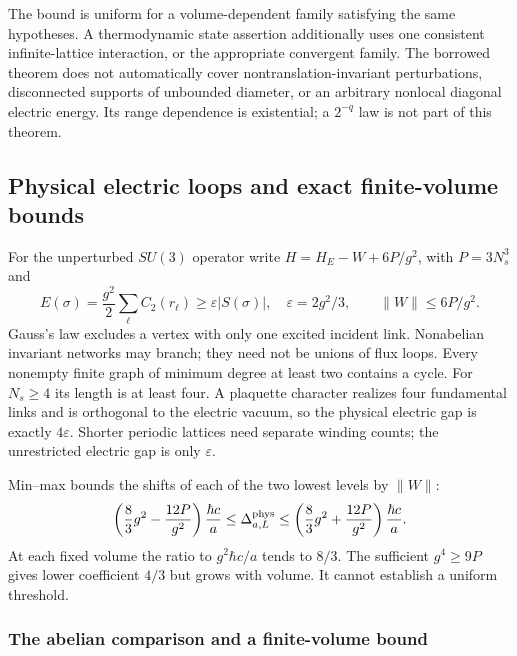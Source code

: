 \documentclass[11pt,a4paper]{article}
\begin{document}
The bound is uniform for a volume-dependent family satisfying the same
hypotheses. A thermodynamic state assertion additionally uses one
consistent infinite-lattice interaction, or the appropriate convergent
family. The borrowed theorem does not automatically cover
nontranslation-invariant perturbations, disconnected supports of
unbounded diameter, or an arbitrary nonlocal diagonal electric energy.
Its range dependence is existential; a \(2^{-q}\) law is not part of
this theorem.

\hypertarget{physical-electric-loops-and-exact-finite-volume-bounds}{%
\subsection{Physical electric loops and exact finite-volume
bounds}\label{physical-electric-loops-and-exact-finite-volume-bounds}}

For the unperturbed \(SU(3)\) operator write \(H=H_E-W+6P/g^2\), with
\(P=3N_s^3\) and \[E(\sigma)=\frac{g^2}{2}\sum_\ell C_2(r_\ell)
 \ge\varepsilon|S(\sigma)|,\quad \varepsilon=2g^2/3,
 \qquad \|W\|\le6P/g^2.\] Gauss's law excludes a vertex with only one
excited incident link. Nonabelian invariant networks may branch; they
need not be unions of flux loops. Every nonempty finite graph of minimum
degree at least two contains a cycle. For \(N_s\ge4\) its length is at
least four. A plaquette character realizes four fundamental links and is
orthogonal to the electric vacuum, so the physical electric gap is
exactly \(4\varepsilon\). Shorter periodic lattices need separate
winding counts; the unrestricted electric gap is only \(\varepsilon\).

Min--max bounds the shifts of each of the two lowest levels by
\(\|W\|\): \[\left(\frac83g^2-\frac{12P}{g^2}\right)\frac{\hbar c}{a}
 \le\Delta^{\rm phys}_{a,L}\le
 \left(\frac83g^2+\frac{12P}{g^2}\right)\frac{\hbar c}{a}.\] At each
fixed volume the ratio to \(g^2\hbar c/a\) tends to \(8/3\). The
sufficient \(g^4\ge9P\) gives lower coefficient \(4/3\) but grows with
volume. It cannot establish a uniform threshold.

\hypertarget{the-abelian-comparison-and-a-finite-volume-bound}{%
\subsubsection{The abelian comparison and a finite-volume
bound}\label{the-abelian-comparison-and-a-finite-volume-bound}}
\end{document}
